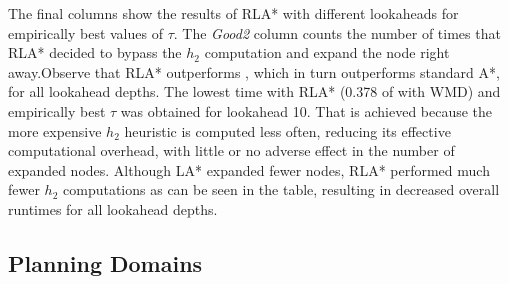 The final columns show the results of RLA* with different lookaheads for
empirically best values of $\tau$. The {\em Good2} column counts the
number of times that RLA* decided to bypass the $h_2$ computation and
expand the node right away.Observe that RLA* outperforms \lazyastar,
which in turn outperforms standard A*, for all lookahead depths. The
lowest time with RLA* (0.378 of \astar with WMD) and empirically best
$\tau$  was obtained for lookahead 10. That is achieved because the
more expensive $h_2$ heuristic is computed less often, reducing its
effective computational overhead, with little or no adverse effect in
the number of expanded nodes. Although LA* expanded fewer nodes, RLA*
performed much fewer $h_2$ computations as can be seen in the table,
resulting in decreased overall runtimes for all lookahead depths.

\subsection{Planning Domains}

